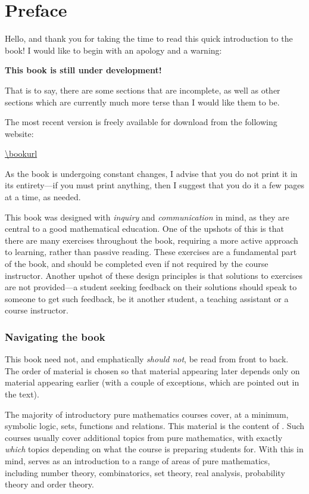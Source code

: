 \chapter*{Preface}

Hello, and thank you for taking the time to read this quick introduction to the book! I would like to begin with an apology and a warning:
\begin{center}
\Large \color{red} \bf This book is still under development!
\end{center}
That is to say, there are some sections that are incomplete, as well as other sections which are currently much more terse than I would like them to be.

The most recent version is freely available for download from the following website:
\begin{center}
\url{\bookurl}
\end{center}
As the book is undergoing constant changes, I advise that you do not print it in its entirety---if you must print anything, then I suggest that you do it a few pages at a time, as needed.

This book was designed with \textit{inquiry} and \textit{communication} in mind, as they are central to a good mathematical education. One of the upshots of this is that there are many exercises throughout the book, requiring a more active approach to learning, rather than passive reading. These exercises are a fundamental part of the book, and should be completed even if not required by the course instructor. Another upshot of these design principles is that solutions to exercises are not provided---a student seeking feedback on their solutions should speak to someone to get such feedback, be it another student, a teaching assistant or a course instructor.

\subsection*{Navigating the book}

This book need not, and emphatically \textit{should not}, be read from front to back. The order of material is chosen so that material appearing later depends only on material appearing earlier (with a couple of exceptions, which are pointed out in the text).

The majority of introductory pure mathematics courses cover, at a minimum, symbolic logic, sets, functions and relations. This material is the content of . Such courses usually cover additional topics from pure mathematics, with exactly \textit{which} topics depending on what the course is preparing students for. With this in mind,  serves as an introduction to a range of areas of pure mathematics, including number theory, combinatorics, set theory, real analysis, probability theory and order theory.

